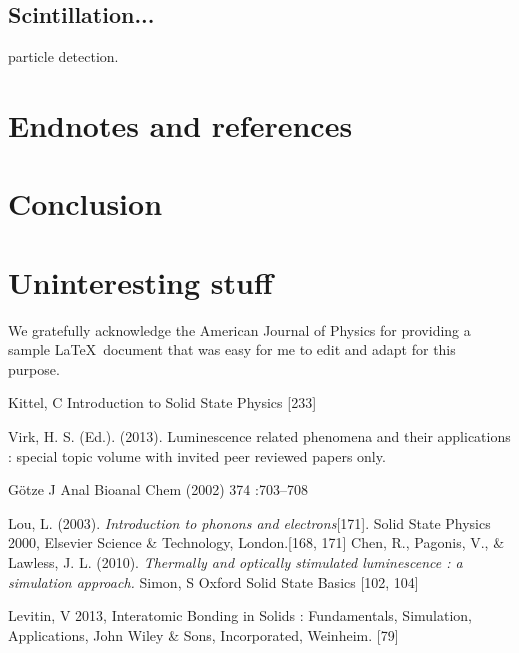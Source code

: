\documentclass[prl,onecolumn]{revtex4-1}  %
\begin{document}
\subsection*{Scintillation...}
particle detection.




\section{Endnotes and references}


\section{Conclusion}



\appendix*   %

\section{Uninteresting stuff}



\begin{acknowledgments}

We gratefully acknowledge the American Journal of Physics for providing a sample
\LaTeX\ document that was easy for me to edit and adapt for this purpose. 

\end{acknowledgments}


\begin{thebibliography}{99}



 Kittel, C Introduction to Solid State Physics [233]

 Virk, H. S. (Ed.). (2013). Luminescence related phenomena and their applications : special topic volume with invited peer reviewed papers only. 

 G\"otze J  Anal Bioanal Chem (2002) 374 :703–708

Lou, L. (2003). \textit{Introduction to phonons and electrons}[171].
 Solid State Physics 2000, Elsevier Science \& Technology, London.[168, 171]
 Chen, R., Pagonis, V., \& Lawless, J. L. (2010). \textit{Thermally and optically stimulated luminescence : a simulation approach. }
 Simon, S Oxford Solid State Basics [102, 104]

 Levitin, V 2013, Interatomic Bonding in Solids : Fundamentals, Simulation, Applications, John Wiley \& Sons, Incorporated, Weinheim. [79]

\end{thebibliography}
\end{document}
